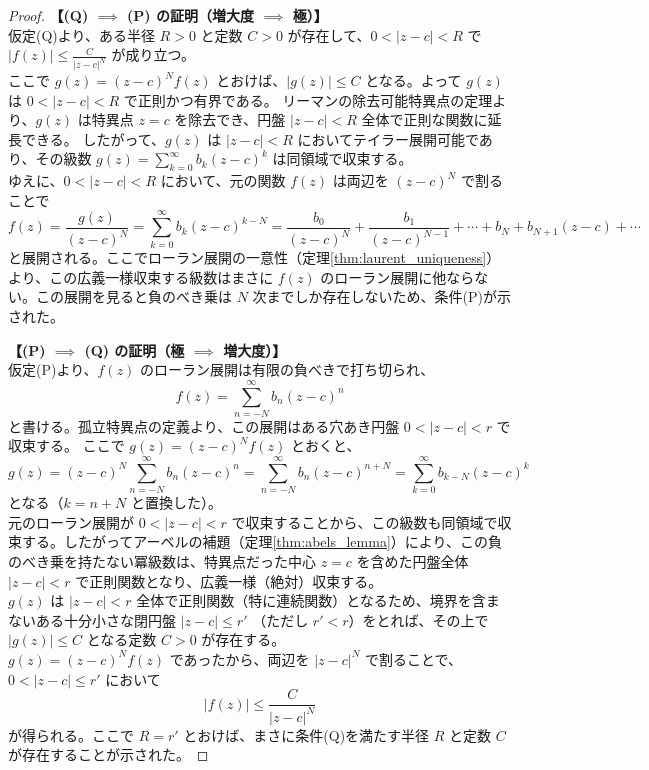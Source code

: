 \begin{proof}
    \textbf{【(Q) $\implies$ (P) の証明（増大度 $\implies$ 極）】}\\
    仮定(Q)より、ある半径 $R > 0$ と定数 $C > 0$ が存在して、$0 < |z-c| < R$ で $|f(z)| \le \frac{C}{|z-c|^N}$ が成り立つ。\\
    ここで $g(z)=(z-c)^{N}f(z)$ とおけば、$|g(z)|\le C$ となる。よって $g(z)$ は $0<|z-c|<R$ で正則かつ有界である。
    リーマンの除去可能特異点の定理より、$g(z)$ は特異点 $z=c$ を除去でき、円盤 $|z-c|<R$ 全体で正則な関数に延長できる。
    したがって、$g(z)$ は $|z-c|<R$ においてテイラー展開可能であり、その級数 $g(z) = \sum_{k=0}^{\infty} b_k (z-c)^k$ は同領域で収束する。\\
    ゆえに、$0 < |z-c| < R$ において、元の関数 $f(z)$ は両辺を $(z-c)^N$ で割ることで
    \[
    f(z) = \frac{g(z)}{(z-c)^N} = \sum_{k=0}^{\infty} b_k (z-c)^{k-N} = \frac{b_0}{(z-c)^N} + \frac{b_1}{(z-c)^{N-1}} + \cdots + b_N + b_{N+1}(z-c) + \cdots
    \]
    と展開される。ここでローラン展開の一意性（定理\ref{thm:laurent_uniqueness}）より、この広義一様収束する級数はまさに $f(z)$ のローラン展開に他ならない。この展開を見ると負のべき乗は $N$ 次までしか存在しないため、条件(P)が示された。

    \vspace{1em}

    \textbf{【(P) $\implies$ (Q) の証明（極 $\implies$ 増大度）】}\\
    仮定(P)より、$f(z)$ のローラン展開は有限の負べきで打ち切られ、
    \[
    f(z) = \sum_{n=-N}^{\infty} b_n (z-c)^n
    \]
    と書ける。孤立特異点の定義より、この展開はある穴あき円盤 $0 < |z-c| < r$ で収束する。
    ここで $g(z) = (z-c)^N f(z)$ とおくと、
    \[
    g(z) = (z-c)^N \sum_{n=-N}^{\infty} b_n (z-c)^n = \sum_{n=-N}^{\infty} b_n (z-c)^{n+N} = \sum_{k=0}^{\infty} b_{k-N} (z-c)^k
    \]
    となる（$k = n+N$ と置換した）。\\
    元のローラン展開が $0 < |z-c| < r$ で収束することから、この級数も同領域で収束する。したがってアーベルの補題（定理\ref{thm:abels_lemma}）により、この負のべき乗を持たない冪級数は、特異点だった中心 $z=c$ を含めた円盤全体 $|z-c| < r$ で正則関数となり、広義一様（絶対）収束する。\\
    $g(z)$ は $|z-c| < r$ 全体で正則関数（特に連続関数）となるため、境界を含まないある十分小さな閉円盤 $|z-c| \le r'$ （ただし $r' < r$）をとれば、その上で $|g(z)| \le C$ となる定数 $C > 0$ が存在する。\\
    $g(z) = (z-c)^N f(z)$ であったから、両辺を $|z-c|^N$ で割ることで、$0 < |z-c| \le r'$ において
    \[
    |f(z)| \le \frac{C}{|z-c|^N}
    \]
    が得られる。ここで $R = r'$ とおけば、まさに条件(Q)を満たす半径 $R$ と定数 $C$ が存在することが示された。
\end{proof}

